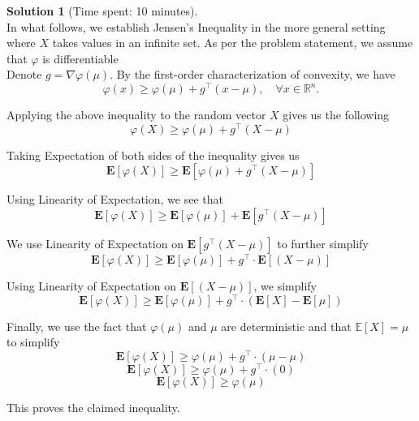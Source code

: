 \documentclass[11pt, reqno, letterpaper, twoside]{amsart}
\theoremstyle{plain}
\theoremstyle{definition}
\newtheorem{solution}[theorem]{Solution}
\begin{document}
\clearpage
\begin{solution}[Time spent: 10 minutes] \\
In what follows, we establish Jensen’s Inequality in the more general setting where $X$ takes values in an infinite set. As per the problem statement, we assume that $\varphi$ is differentiable \\

\noindent Denote \( g = \nabla \varphi(\mu) \).  
By the first-order characterization of convexity, we have
\[
\varphi(x)\geq \varphi(\mu) + g^\top (x - \mu), 
\quad \forall x \in \mathbb{R}^n.
\]

Applying the above inequality to the random vector \(X\) gives us the following
\[
\varphi(X)\ge \varphi(\mu)+ g^\top \left(X-\mu\right)
\]

Taking Expectation of both sides of the inequality gives us 
\[
\mathbf{E} \left[ \varphi(X) \right]\ge \mathbf{E} \left[ \varphi(\mu)+ g^\top \left(X-\mu\right) \right]
\]

Using Linearity of Expectation, we see that
\[
\mathbf{E} \left[ \varphi(X) \right]\ge \mathbf{E} \left[ \varphi(\mu) \right] + \mathbf{E} \left[ g^\top \left(X-\mu\right) \right]
\]

We use Linearity of Expectation on $\mathbf{E} \left[ g^\top \left(X-\mu\right) \right]$ to further simplify
\[
\mathbf{E} \left[ \varphi(X) \right]\ge \mathbf{E} \left[ \varphi(\mu) \right] + g^\top \cdot \mathbf{E} \left[\left(X-\mu\right) \right]
\]

Using Linearity of Expectation on $\mathbf{E} \left[\left(X-\mu\right) \right]$, we simplify 
\[
\mathbf{E} \left[ \varphi(X) \right]\ge \mathbf{E} \left[ \varphi(\mu) \right] + g^\top \cdot \left( \mathbf{E} \left[X \right] - \mathbf{E} \left[\mu \right] \right)
\]

Finally, we use the fact that $\varphi(\mu)$ and $\mu$ are deterministic and that \(\mathbb{E}[X]=\mu\) to simplify
\[
\mathbf{E} \left[ \varphi(X) \right]\ge \varphi(\mu) + g^\top \cdot \left( \mu - \mu \right)
\]
\[
\mathbf{E} \left[ \varphi(X) \right]\ge \varphi(\mu) + g^\top \cdot \left( 0 \right)
\]
\[
\mathbf{E} \left[ \varphi(X) \right]\ge \varphi(\mu)
\]

This proves the claimed inequality.

\end{solution}
\end{document}
